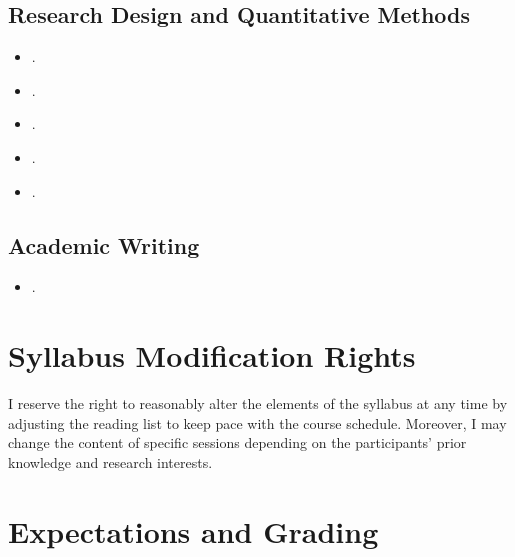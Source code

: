 \documentclass[abstract=on,parskip=full,headings=standardclasses,fontsize=11pt,paper=a4]{scrartcl}
\begin{document}
\subsection*{Research Design and Quantitative Methods}
\begin{itemize}
\item {}.
\item {}.
\item {}.
\item {}.
\item {}.
\end{itemize}

\subsection*{Academic Writing}
\begin{itemize}
\item {}.
\end{itemize}


\section*{Syllabus Modification Rights}

I reserve the right to reasonably alter the elements of the syllabus at any time by adjusting the reading list to keep pace with the course schedule. Moreover, I may change the content of specific sessions depending on the participants' prior knowledge and research interests.


\section*{Expectations and Grading}
\end{document}
